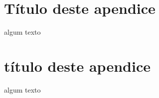 \begin{apendicesenv}

\partapendices
\chapter{Título deste apendice}

algum texto

\chapter{título deste apendice}
algum texto

\end{apendicesenv}
